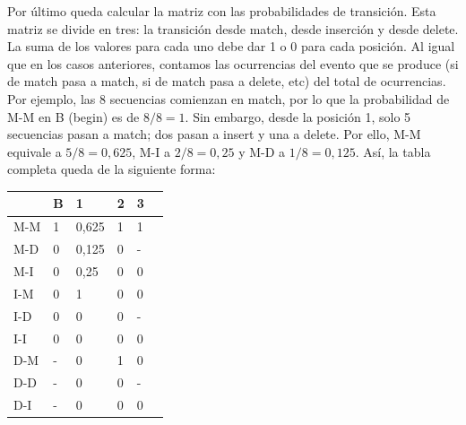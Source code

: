 Por último queda calcular la matriz con las probabilidades de transición. Esta matriz se divide en tres: la transición desde match, desde inserción y desde delete. La suma de los valores para cada uno debe dar 1 o 0 para cada posición. Al igual que en los casos anteriores, contamos las ocurrencias del evento que se produce (si de match pasa a match, si de match pasa a delete, etc) del total de ocurrencias. Por ejemplo, las 8 secuencias comienzan en match, por lo que la probabilidad de M-M en B (begin) es de $8/8 = 1$. Sin embargo, desde la posición 1, solo 5 secuencias pasan a match; dos pasan a insert y una a delete. Por ello, M-M equivale a $5/8 = 0,625$, M-I a $2/8 = 0,25$ y M-D a $1/8 = 0,125$. Así, la tabla completa queda de la siguiente forma:
\begin{table}[htbp]
\centering
\begin{tabular}{l | l l l l l}
& B & 1 & 2 & 3  \\ \hline
M-M & 1 & 0,625 & 1 & 1 \\
M-D & 0 & 0,125 & 0 & - \\
M-I & 0 & 0,25 & 0 & 0 \\ \hline
I-M & 0& 1 & 0 & 0 \\
I-D & 0 & 0 & 0 & - \\
I-I & 0 & 0 & 0 & 0 \\ \hline
D-M & - & 0 & 1 & 0 \\
D-D & - & 0 & 0 & - \\
D-I & - & 0 & 0 & 0
\end{tabular}
\end{table}